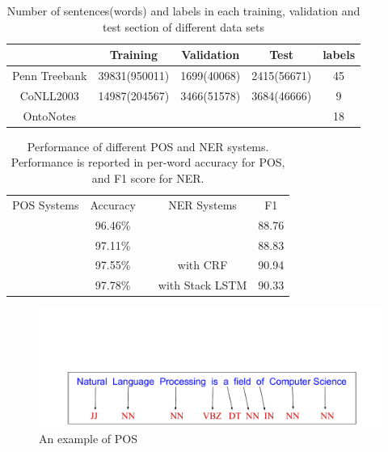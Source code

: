 \documentclass{sfuthesis}
\begin{document}

\begin{table}[]
\centering
\caption{Number of sentences(words) and labels in each training, validation and test section of different data sets}
\label{table:my-dataset}
\begin{tabular}{|c|c|c|c|c|} \hline
      & Training  & Validation  & Test  & labels  \\ \hline
Penn Treebank   &39831(950011) &1699(40068) &2415(56671) &45\\\hline
CoNLL2003   &14987(204567) &3466(51578) &3684(46666) &9     \\\hline
OntoNotes   & & & &18     \\\hline
\end{tabular}
\end{table}


\begin{table}[]
\centering
\caption{Performance of different POS and NER systems. Performance is reported in per-word accuracy for POS, and F1 score for NER. }
\label{table:my-performance}
\begin{tabular}{cclcc}
POS Systems       & Accuracy &  & NER Systems           & F1
\\ \cline{1-2} \cline{4-5} 
\text{\cite{mccallum2000maximum}} & 96.46\%                      &  & \text{\cite{florian2003named}}                 & 88.76                  \\
\text{\cite{collins2002discriminative}}    & 97.11\%                      &  & \text{\cite{huang2015bidirectional}}           & 88.83                  \\
\text{\cite{huang2015bidirectional}}       & 97.55\%                      &  & \text{\cite{lample2016neural}} with CRF        & 90.94                  \\
\text{\cite{ling2015finding}}              & 97.78\%                      &  & \text{\cite{lample2016neural}} with Stack LSTM & 90.33                 
\end{tabular}
\end{table}

\begin{figure}
  \centering
  \includegraphics[scale=0.5]{posex.pdf}
 \caption{An example of POS}
  \label{fig:pos-ex}
\end{figure}
\end{document}
